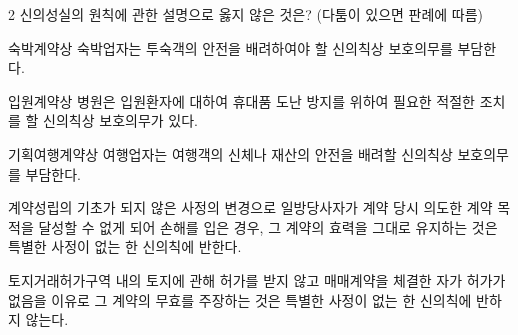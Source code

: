 \begin{question}{2}
신의성실의 원칙에 관한 설명으로 옳지 않은 것은? (다툼이 있으면 판례에 따름)
\begin{choices}
  \item 숙박계약상 숙박업자는 투숙객의 안전을 배려하여야 할 신의칙상 보호의무를 부담한다.
  \item 입원계약상 병원은 입원환자에 대하여 휴대품 도난 방지를 위하여 필요한 적절한 조치를 할 신의칙상 보호의무가 있다.
  \item 기획여행계약상 여행업자는 여행객의 신체나 재산의 안전을 배려할 신의칙상 보호의무를 부담한다.
  \item 계약성립의 기초가 되지 않은 사정의 변경으로 일방당사자가 계약 당시 의도한 계약 목적을 달성할 수 없게 되어 손해를 입은 경우, 그 계약의 효력을 그대로 유지하는 것은 특별한 사정이 없는 한 신의칙에 반한다.
  \item 토지거래허가구역 내의 토지에 관해 허가를 받지 않고 매매계약을 체결한 자가 허가가 없음을 이유로 그 계약의 무효를 주장하는 것은 특별한 사정이 없는 한 신의칙에 반하지 않는다.
\end{choices}
\end{question}
